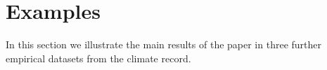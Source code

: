 \documentclass[authoryear, preprint,review,12pt]{elsarticle}
\begin{document}
\section{Examples}\label{examples}
In this section we illustrate the main results of the paper in three further empirical datasets from the climate record.  


\pagebreak

\section*{ }%

\end{document}
